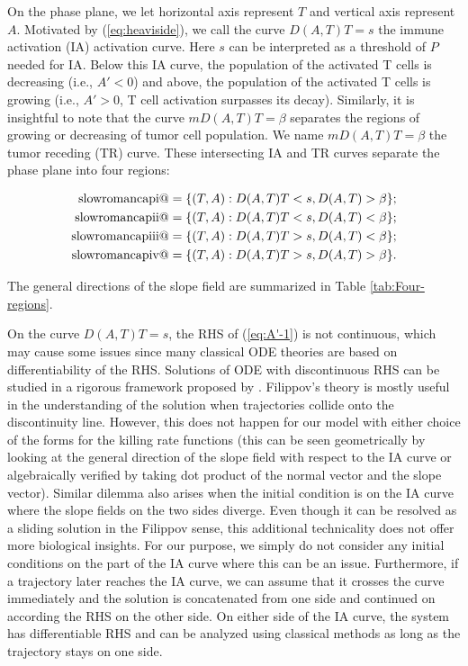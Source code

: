 \documentclass[review,authoryear]{elsarticle}
\makeatletter
\newcommand*{\rom}[1]{\expandafter\@slowromancap\romannumeral #1@}
\makeatother
\begin{document}
On the phase plane, we let horizontal axis
represent $T$ and vertical axis represent $A$. Motivated by (\ref{eq:heaviside}), we call the curve
$D(A,T)T=s$ the immune activation (IA) activation curve. Here $s$ can be interpreted as a threshold of $P$ needed for IA. Below this IA curve, the population
of the activated T cells is decreasing (i.e., $A'<0$) and above, the population
of the activated T cells is growing (i.e., $A'>0$, T cell activation surpasses its decay).
Similarly, it is insightful to note that the curve $mD(A,T)T=\beta$
separates the regions of growing or decreasing of tumor cell population. We name
$mD(A,T)T=\beta$ the tumor receding (TR) curve. These intersecting IA and TR curves separate
the phase plane into four regions: 
\begin{linenomath*}
\begin{align*} 
\text{\rom{1}} &=  \{(T,A): D(A,T)T<s, D(A,T)>\beta \}; \\ 
\text{\rom{2}} &=  \{(T,A): D(A,T)T<s, D(A,T)<\beta \}; \\ 
\text{\rom{3}} &=  \{(T,A): D(A,T)T>s, D(A,T)<\beta \}; \\ 
\text{\rom{4}} &=  \{(T,A): D(A,T)T>s, D(A,T)>\beta \}. 
\end{align*}
\end{linenomath*}
The general directions of the slope field are summarized in Table \ref{tab:Four-regions}. 

On the curve $D(A,T)T=s$, the RHS of (\ref{eq:A'-1})
is not continuous, which may cause some issues since many classical
ODE theories are based on differentiability of the RHS. Solutions of ODE
with discontinuous RHS can be studied in a rigorous framework proposed
by \citet{Filippov1988}. Filippov's theory is mostly useful
in the understanding of the solution when trajectories collide onto the
discontinuity line. However, this does not happen for our model with
either choice of the forms for the killing rate functions (this can be seen geometrically by looking
at the general direction of the slope field with respect to the IA
curve or algebraically verified by taking dot product of the normal
vector and the slope vector). Similar dilemma also arises when the
initial condition is on the IA curve where the slope fields on the
two sides diverge. Even though it can be resolved as a sliding solution
in the Filippov sense, this additional technicality does not offer more
biological insights. For our
purpose, we simply do not consider any initial conditions on the part of the IA
curve where this can be an issue. Furthermore, if a trajectory later reaches the IA curve, we
can assume that it crosses the curve immediately and the solution
is concatenated from one side and continued on according the RHS on
the other side. On either side of the IA curve, the system has differentiable RHS and
can be analyzed using classical methods as long as the trajectory
stays on one side. 
\end{document}
